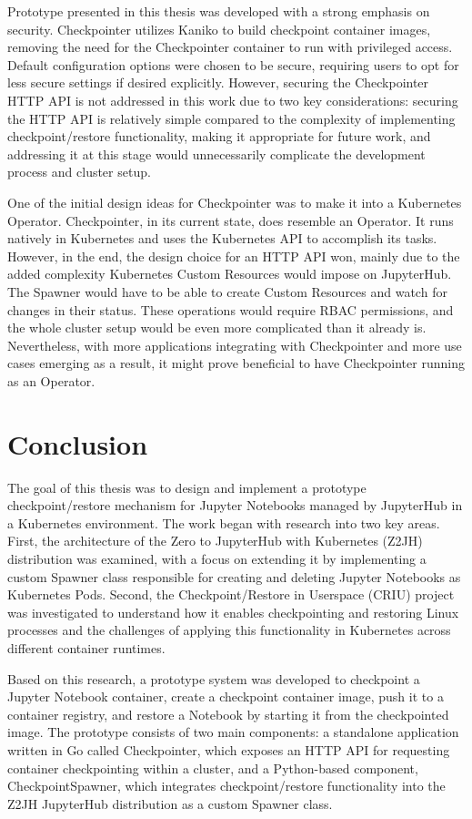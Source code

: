 \documentclass[
  digital,     %
  oneside,     %
  nosansbold,  %
  nocolorbold, %
  lof,         %
  nolot,         %
]{fithesis4}
\begin{document}
Prototype presented in this thesis was developed with a strong emphasis on security. Checkpointer utilizes Kaniko to build checkpoint container images, removing the need for the Checkpointer container to run with privileged access. Default configuration options were chosen to be secure, requiring users to opt for less secure settings if desired explicitly. However, securing the Checkpointer HTTP API is not addressed in this work due to two key considerations: securing the HTTP API is relatively simple compared to the complexity of implementing checkpoint/restore functionality, making it appropriate for future work, and addressing it at this stage would unnecessarily complicate the development process and cluster setup.

One of the initial design ideas for Checkpointer was to make it into a Kubernetes Operator. Checkpointer, in its current state, does resemble an Operator. It runs natively in Kubernetes and uses the Kubernetes API to accomplish its tasks. However, in the end, the design choice for an HTTP API won, mainly due to the added complexity Kubernetes Custom Resources would impose on JupyterHub. The Spawner would have to be able to create Custom Resources and watch for changes in their status. These operations would require RBAC permissions, and the whole cluster setup would be even more complicated than it already is. Nevertheless, with more applications integrating with Checkpointer and more use cases emerging as a result, it might prove beneficial to have Checkpointer running as an Operator.



\chapter{Conclusion}
The goal of this thesis was to design and implement a prototype checkpoint/restore mechanism for Jupyter Notebooks managed by JupyterHub in a Kubernetes environment. The work began with research into two key areas. First, the architecture of the Zero to JupyterHub with Kubernetes (Z2JH) distribution was examined, with a focus on extending it by implementing a custom Spawner class responsible for creating and deleting Jupyter Notebooks as Kubernetes Pods. Second, the Checkpoint/Restore in Userspace (CRIU) project was investigated to understand how it enables checkpointing and restoring Linux processes and the challenges of applying this functionality in Kubernetes across different container runtimes.

Based on this research, a prototype system was developed to checkpoint a Jupyter Notebook container, create a checkpoint container image, push it to a container registry, and restore a Notebook by starting it from the checkpointed image. The prototype consists of two main components: a standalone application written in Go called Checkpointer, which exposes an HTTP API for requesting container checkpointing within a cluster, and a Python-based component, CheckpointSpawner, which integrates checkpoint/restore functionality into the Z2JH JupyterHub distribution as a custom Spawner class.
\end{document}
